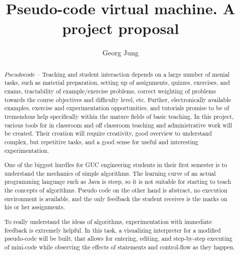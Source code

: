 \documentclass[a4paper]{article}
\author{Georg Jung}
\title{Pseudo-code virtual machine. A project proposal}
\begin{document}
\maketitle

\begin{abstract}
  $ Pseudo code $ -- Teaching and student interaction depends on a large number of menial
  tasks, such as material preparation, setting up of assignments,
  quizzes, exercises, and exams, tractability of example/exercise
  problems, correct weighting of problems towards the course
  objectives and difficulty level, etc. Further, electronically
  available examples, exercise and experimentation opportunities, and
  tutorials promise to be of tremendous help specifically within the
  mature fields of basic teaching. In this project, various tools for
  in classroom and off classroom teaching and administrative work will
  be created. Their creation will require creativity, good overview to
  understand complex, but repetitive tasks, and a good sense for
  useful and interesting experimentation.

  One of the biggest hurdles for GUC engineering students in their
  first semester is to understand the mechanics of simple
  algorithms. The learning curve of an actual programming language
  such as Java is steep, so it is not suitable for starting to teach
  the concepts of algorithms. Pseudo code on the other hand is
  abstract, no execution environment is available, and the only
  feedback the student receives is the marks on his or her
  assignments.

  To really understand the ideas of algorithms, experimentation with
  immediate feedback is extremely helpful. In this task, a visualizing
  interpreter for a modified pseudo-code will be built, that allows
  for entering, editing, and step-by-step executing of mini-code while
  observing the effects of statements and control-flow as they happen.
\end{abstract}
\end{document}

